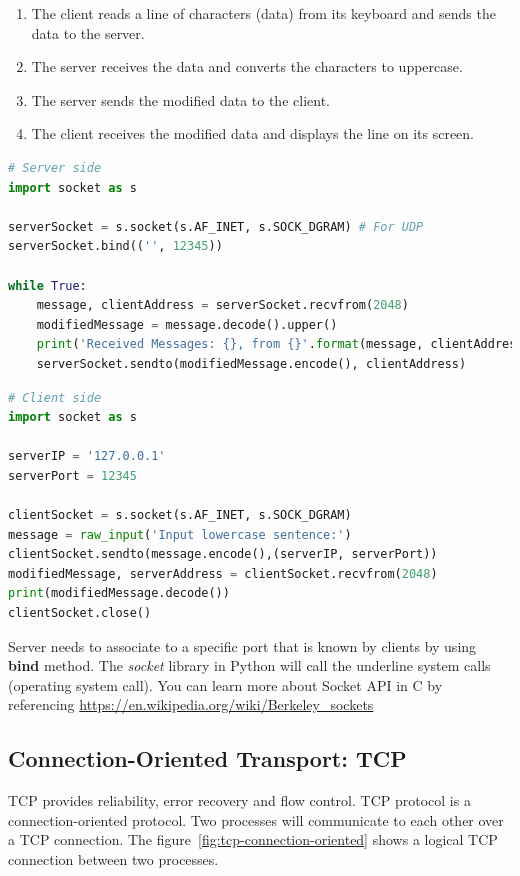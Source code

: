 \documentclass[a4paper, 11pt]{article}
\begin{document}
\begin{enumerate}
\item The client reads a line of characters (data) from its keyboard and sends the data to the server. 
\item The server receives the data and converts the characters to uppercase.
\item The server sends the modified data to the client.
\item The client receives the modified data and displays the line on its screen.
\end{enumerate}

\begin{lstlisting}[language=Python, caption= UDP Server]
# Server side
import socket as s

serverSocket = s.socket(s.AF_INET, s.SOCK_DGRAM) # For UDP
serverSocket.bind(('', 12345))

while True:
    message, clientAddress = serverSocket.recvfrom(2048)
    modifiedMessage = message.decode().upper()
    print('Received Messages: {}, from {}'.format(message, clientAddress))
    serverSocket.sendto(modifiedMessage.encode(), clientAddress)
\end{lstlisting}

\begin{lstlisting}[language=Python, caption= UDP Client]
# Client side
import socket as s

serverIP = '127.0.0.1'
serverPort = 12345

clientSocket = s.socket(s.AF_INET, s.SOCK_DGRAM)
message = raw_input('Input lowercase sentence:')
clientSocket.sendto(message.encode(),(serverIP, serverPort))
modifiedMessage, serverAddress = clientSocket.recvfrom(2048)
print(modifiedMessage.decode())
clientSocket.close()
\end{lstlisting}

Server needs to associate to a specific port that is known by clients by using \textbf{bind} method. The \textit{socket} library in Python will call the underline system calls (operating system call). You can learn more about Socket API in C by referencing \url{https://en.wikipedia.org/wiki/Berkeley_sockets}

\subsection{Connection-Oriented Transport: TCP}

TCP provides reliability, error recovery and  flow control. TCP protocol is a connection-oriented protocol. Two processes will communicate to each other over a TCP connection. The figure~\ref{fig:tcp-connection-oriented} shows a logical TCP connection between two processes.
\end{document}
